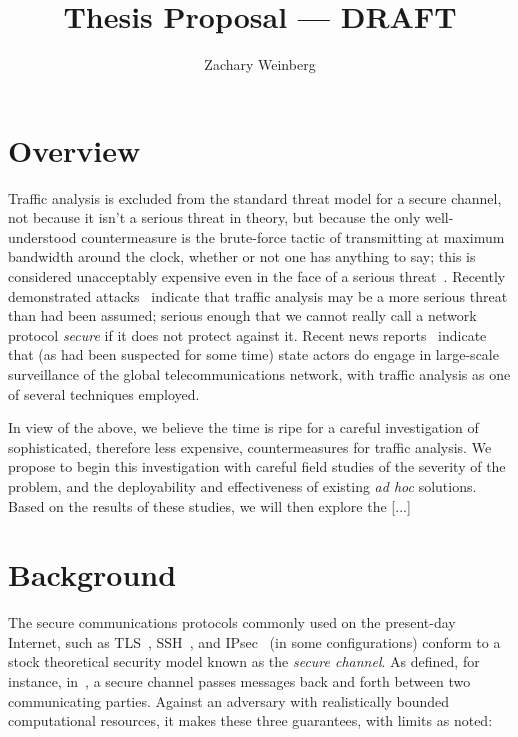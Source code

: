 \documentclass[oneside,tinymargin]{zarticle}
\begin{document}
\title{Thesis Proposal --- DRAFT}
\author{Zachary Weinberg}
\maketitle

\begin{multicols}{2}

\section{Overview}

Traffic analysis is excluded from the standard threat model for a
secure channel, not because it isn't a serious threat in theory, but
because the only well-understood countermeasure is the brute-force
tactic of transmitting at maximum bandwidth around the clock, whether
or not one has anything to say; this is considered unacceptably
expensive even in the face of a serious
threat~\cite{ferguson2010ceng}.  Recently demonstrated
attacks~\cite{duong2012crime, herrmann2012analyzing,
  zhang2010sidebuster, cai2012touching, overlier2006locating} indicate
that traffic analysis may be a more serious threat than had been
assumed; serious enough that we cannot really call a network protocol
\emph{secure} if it does not protect against it.  Recent news
reports~\cite{greenwald2013nsa} indicate that (as had been suspected
for some time) state actors do engage in large-scale surveillance of
the global telecommunications network, with traffic analysis as one of
several techniques employed.

In view of the above, we believe the time is ripe for a careful
investigation of sophisticated, therefore less expensive,
countermeasures for traffic analysis.  We propose to begin this
investigation with careful field studies of the severity of the
problem, and the deployability and effectiveness of existing
\emph{ad hoc} solutions.  Based on the results of these studies,
we will then explore the [...]

\section{Background}

The secure communications protocols commonly used on the present-day
Internet, such as TLS~\cite{dierks2008tls}, SSH~\cite{ylonen2006ssh},
and IPsec~\cite{kent2005ipsec} (in some configurations) conform to a
stock theoretical security model known as the \emph{secure channel}.
As defined, for instance, in~\textcite{ferguson2010ceng}, a secure
channel passes messages back and forth between two communicating
parties.  Against an adversary with realistically bounded
computational resources, it makes these three guarantees, with limits
as noted:


\end{multicols}
\end{document}
